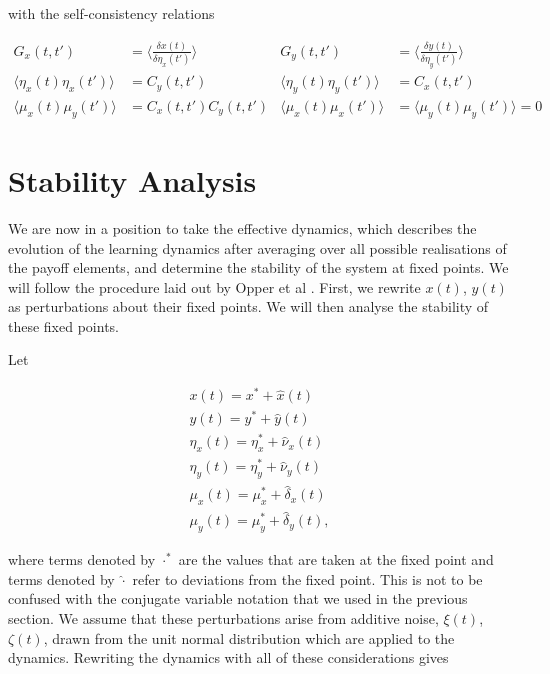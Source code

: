 \documentclass[.../main.tex]{subfiles}
\begin{document}
with the self-consistency relations

\begin{align}
	G_x(t, t') &= \langle \frac{\delta x(t)}{\delta \eta_x(t')}\rangle  & G_y(t, t') &= \langle \frac{\delta y(t)}{\delta
	\eta_y(t')}\rangle  \\
	\langle \eta_x(t) \eta_x(t')\rangle  &= C_y(t, t') & \langle \eta_y(t) \eta_y(t')\rangle  &= C_x(t, t')\\
	\langle \mu_x(t) \mu_y(t')\rangle  &= C_x(t, t') C_y(t, t') & \langle \mu_x(t) \mu_x(t')\rangle  &= \langle \mu_y(t) \mu_y(t')\rangle  = 0
\end{align}

\section{Stability Analysis} %
\label{sec:appstability_analysis}

We are now in a position to take the effective dynamics, which describes the evolution of the
learning dynamics after averaging over all possible realisations of the payoff elements, and
determine the stability of the system at fixed points. We will follow the procedure laid out by
Opper et al \cite{Opper1992}. First, we rewrite $x(t)$, $y(t)$ as perturbations about their fixed
points. We will then analyse the stability of these fixed points.

Let

\begin{align}
	x(t) = x^* + \hat{x}(t) \\
	y(t) = y^* + \hat{y}(t) \\
	\eta_x(t) = \eta_x^* + \hat{\nu}_x(t)\\
	\eta_y(t) = \eta_y^* + \hat{\nu}_y(t)\\
	\mu_x(t) = \mu_x^* + \hat{\delta}_x(t)\\
	\mu_y(t) = \mu_y^* + \hat{\delta}_y(t),
\end{align}

where terms denoted by $\cdot^*$ are the values that are taken at the fixed point and terms denoted
by $\hat{\cdot}$ refer to deviations from the fixed point. This is not to be confused with
the conjugate variable notation that we used in the previous section. We assume that these
perturbations arise from additive noise, $\xi(t)$, $\zeta(t)$, drawn from the unit normal
distribution which are applied to the dynamics. Rewriting the dynamics with all of these
considerations gives
\end{document}
